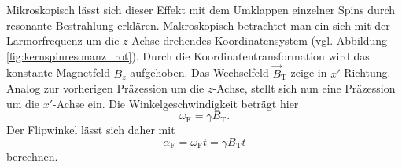 \documentclass[
    11pt,
    ngerman
]{scrbook}
\begin{document}
Mikroskopisch lässt sich dieser Effekt mit dem Umklappen einzelner Spins durch
resonante Bestrahlung erklären. Makroskopisch betrachtet man ein sich mit der
Larmorfrequenz um die $z$-Achse drehendes Koordinatensystem (vgl. Abbildung
\ref{fig:kernspinresonanz_rot}). Durch die Koordinatentransformation wird das
konstante Magnetfeld $B_z$ aufgehoben. Das Wechselfeld $\vec B_\text{T}$ zeige
in $x'$-Richtung. Analog zur vorherigen Präzession um die $z$-Achse, stellt
sich nun eine Präzession um die $x'$-Achse ein. Die Winkelgeschwindigkeit
beträgt hier
\[
    \omega_\text{F} = \gamma B_\text{T}.
\]
Der Flipwinkel lässt sich daher mit
\[
    \alpha_\text{F} = \omega_\text{F} t = \gamma B_\text{T} t
\]
berechnen.

\begin{figure}[htbp]
    \begin{minipage}[htbp]{.45\textwidth}
        \centering
\end{minipage}
\end{figure}
\end{document}
